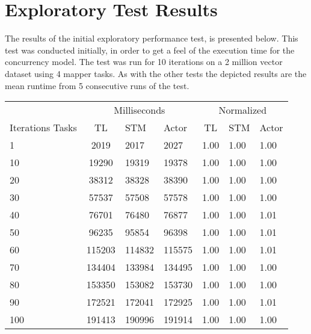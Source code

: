 \chapter[]{Exploratory Test Results}
\label{app:explo_result}
The results of the initial exploratory performance test, is presented below. This test was conducted initially, in order to get a feel of the execution time for the concurrency model. The test was run for 10 iterations on a 2 million vector dataset using 4 mapper tasks. As with the other tests the depicted results are the mean runtime from 5 consecutive runs of the test.

\begin{table}[h]
\centering
\begin{tabular}{l|cll|cll}
             & \multicolumn{3}{c|}{Milliseconds} & \multicolumn{3}{c}{Normalized} \\
Iterations Tasks & TL     & STM     & Actor     & TL      & STM      & Actor     \\ \hline
1  	&		2019		&      2017		&		2027    &  1.00   & 1.00 &    1.00    \\
10	&		19290		&      19319		&		19378   &  1.00   & 1.00 &    1.00    \\
20	&		38312		&      38328		&		38390   &  1.00   & 1.00 &    1.00    \\
30	&		57537		&      57508		&		57578   &  1.00   & 1.00 &    1.00    \\
40	&		76701		&      76480		&		76877   &  1.00   & 1.00 &    1.01    \\
50	&		96235		&      95854 	&		96398   &  1.00   & 1.00 &    1.01    \\
60  	&		115203	&      114832	&		115575  &  1.00   & 1.00 &    1.01    \\
70	&		134404	&      133984	&		134495  &  1.00   & 1.00 &    1.00    \\
80	&		153350	&      153082	&		153730  &  1.00   & 1.00 &    1.00    \\
90	&		172521	&      172041	&		172925  &  1.00   & 1.00 &    1.01    \\
100	&		191413	&      190996	&		191914  &  1.00   & 1.00 &    1.00    \\
\end{tabular}
\label{table:test_results_concurrent_tasks}
\end{table}
\label{table:test_results_iterations}

